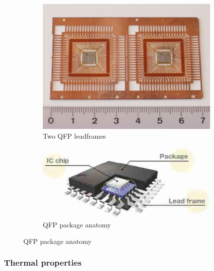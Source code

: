 \documentclass[final]{cubedoc}
\begin{document}
	\begin{figure}[h!]
		\centering
		\begin{subfigure}{.5\textwidth}
			\centering
			\includegraphics[keepaspectratio, width=0.7\linewidth]{docs/leadframe_qfp.jpg}
			\caption{Two QFP leadframes}
			\label{fig:sub1}
		\end{subfigure}%
		\begin{subfigure}{.5\textwidth}
			\centering
			\includegraphics[keepaspectratio, width=\linewidth, height=.6\textheight]{docs/qfp_anatomy.jpg}
			\caption{QFP package anatomy}
			\label{fig:sub2}
		\end{subfigure}
		\label{fig:test}
	\end{figure}
	
	\subsubsection{Thermal properties}
	
	
\end{document}

